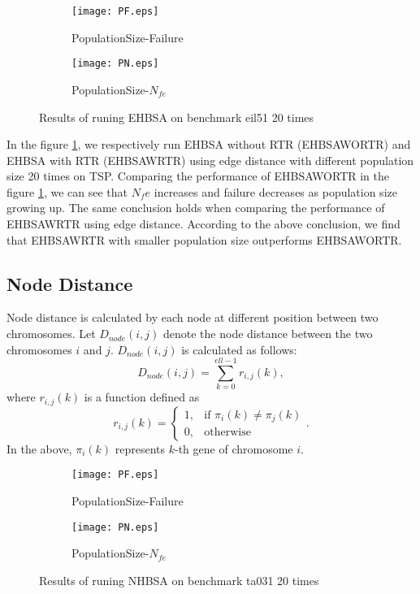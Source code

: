 \begin{figure}[htbp] 
        \centering
        \begin{subfigure}{0.4\textwidth}
            \texttt{[image: PF.eps]}
            \caption{PopulationSize-Failure} 
        \end{subfigure}
        \begin{subfigure}{0.4\textwidth} 
            \texttt{[image: PN.eps]}
            \caption{PopulationSize-$N_{fe}$}
        \end{subfigure}

        \caption{Results of runing EHBSA on benchmark eil51 20 times} 
        \label{fig:ehbsa_pf}
\end{figure}

In the figure \ref{fig:ehbsa_pf}, we respectively run EHBSA without RTR (EHBSAWORTR) and EHBSA with RTR (EHBSAWRTR) using edge distance with different population size 20 times on TSP.  Comparing the performance of EHBSAWORTR in the figure \ref{fig:ehbsa_pf}, we can see that $N_fe$ increases and failure decreases as population size growing up. The same conclusion holds when comparing the performance of EHBSAWRTR using edge distance. According to the above conclusion, we find that EHBSAWRTR with smaller population size outperforms EHBSAWORTR.

\subsection{Node Distance}
Node distance is calculated by each node at different position between two chromosomes. Let $D_{node} (i,j)$ denote the node distance between the two chromosomes $i$ and $j$. $D_{node} (i,j)$ is calculated as follows:\[D_{node} (i,j)=\sum_{k=0}^{ell-1} r_{i,j} (k), \]
where $r_{i,j} (k)$ is a function defined as \[r_{i,j} (k)=
\begin{cases}
1,  & \mbox{if }\pi_i(k)\neq \pi_j(k) \\
0, & \mbox{otherwise}
\end{cases}
.\]
In the above, $\pi_i(k)$  represents $k$-th gene of chromosome $i$.


\begin{figure}[htbp] 
        \centering
        \begin{subfigure}{0.45\textwidth}
            \texttt{[image: PF.eps]}
            \caption{PopulationSize-Failure} 
        \end{subfigure}
        \begin{subfigure}{0.45\textwidth} 
            \texttt{[image: PN.eps]}
            \caption{PopulationSize-$N_{fe}$}
        \end{subfigure}

        \caption{Results of runing NHBSA on benchmark ta031 20 times} 
        \label{fig:nhbsa_pf}
\end{figure}


